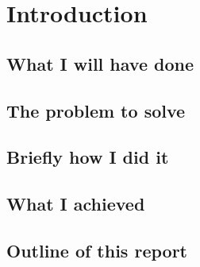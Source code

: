 \chapter{Introduction}\label{chapter:intro}
  \section{What I will have done}
  
  \section{The problem to solve}
  
  \section{Briefly how I did it}

  \section{What I achieved}

  \section{Outline of this report}